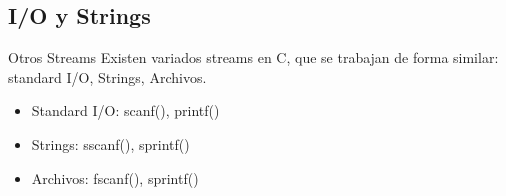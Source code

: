 \documentclass{beamer}
\begin{document}
\subsection{I/O y Strings}
\begin{frame}[fragile]{Otros Streams}
Existen variados streams en C, que se trabajan de forma similar: standard I/O, Strings, Archivos.
\begin{itemize}
\item Standard I/O: scanf(), printf()
\item Strings: sscanf(), sprintf()
\item Archivos: fscanf(), sprintf()
\end{itemize} 

\end{frame}
%
\end{document}
